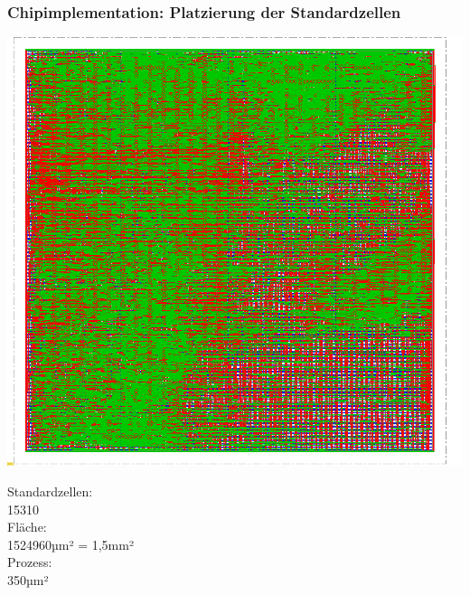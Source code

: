 \begin{frame}\frametitle{Chipimplementation: Platzierung der Standardzellen}
\begin{minipage}{0.69\textwidth}
 \includegraphics[width=1\textwidth]{img/FP_5.png}
\end{minipage}
\hfill%
\begin{minipage}{0.29\textwidth}
  Standardzellen:\\ \vspace{0.3cm}  \num{15310}\\
  Fläche:\\ \vspace{0.3cm} \num{1524960}µm² = 1,5mm²\\
  Prozess: \\ \vspace{0.3cm} 350µm²
\end{minipage}
\end{frame}










